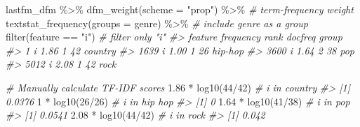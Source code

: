 \documentclass[
]{article}
\newenvironment{Shaded}{\begin{snugshade}}{\end{snugshade}}
\newcommand{\AttributeTok}[1]{\textcolor[rgb]{0.77,0.63,0.00}{#1}}
\newcommand{\CommentTok}[1]{\textcolor[rgb]{0.56,0.35,0.01}{\textit{#1}}}
\newcommand{\DecValTok}[1]{\textcolor[rgb]{0.00,0.00,0.81}{#1}}
\newcommand{\FloatTok}[1]{\textcolor[rgb]{0.00,0.00,0.81}{#1}}
\newcommand{\FunctionTok}[1]{\textcolor[rgb]{0.00,0.00,0.00}{#1}}
\newcommand{\NormalTok}[1]{#1}
\newcommand{\SpecialCharTok}[1]{\textcolor[rgb]{0.00,0.00,0.00}{#1}}
\newcommand{\StringTok}[1]{\textcolor[rgb]{0.31,0.60,0.02}{#1}}
\begin{document}
\begin{Shaded}
\begin{Highlighting}[]
\NormalTok{lastfm\_dfm }\SpecialCharTok{\%\textgreater{}\%} 
  \FunctionTok{dfm\_weight}\NormalTok{(}\AttributeTok{scheme =} \StringTok{"prop"}\NormalTok{) }\SpecialCharTok{\%\textgreater{}\%} \CommentTok{\# term{-}frequency weight}
  \FunctionTok{textstat\_frequency}\NormalTok{(}\AttributeTok{groups =}\NormalTok{ genre) }\SpecialCharTok{\%\textgreater{}\%} \CommentTok{\# include genre as a group}
  \FunctionTok{filter}\NormalTok{(feature }\SpecialCharTok{==} \StringTok{"i"}\NormalTok{) }\CommentTok{\# filter only "i"}
\CommentTok{\#\textgreater{}      feature frequency rank docfreq   group}
\CommentTok{\#\textgreater{} 1          i      1.86    1      42 country}
\CommentTok{\#\textgreater{} 1639       i      1.00    1      26 hip{-}hop}
\CommentTok{\#\textgreater{} 3600       i      1.64    2      38     pop}
\CommentTok{\#\textgreater{} 5012       i      2.08    1      42    rock}
\end{Highlighting}
\end{Shaded}

\begin{Shaded}
\begin{Highlighting}[]
\CommentTok{\# Manually calculate TF{-}IDF scores}
\FloatTok{1.86} \SpecialCharTok{*} \FunctionTok{log10}\NormalTok{(}\DecValTok{44}\SpecialCharTok{/}\DecValTok{42}\NormalTok{)  }\CommentTok{\# i in country}
\CommentTok{\#\textgreater{} [1] 0.0376}
\DecValTok{1} \SpecialCharTok{*} \FunctionTok{log10}\NormalTok{(}\DecValTok{26}\SpecialCharTok{/}\DecValTok{26}\NormalTok{)  }\CommentTok{\# i in hip hop}
\CommentTok{\#\textgreater{} [1] 0}
\FloatTok{1.64} \SpecialCharTok{*} \FunctionTok{log10}\NormalTok{(}\DecValTok{41}\SpecialCharTok{/}\DecValTok{38}\NormalTok{)  }\CommentTok{\# i in pop}
\CommentTok{\#\textgreater{} [1] 0.0541}
\FloatTok{2.08} \SpecialCharTok{*} \FunctionTok{log10}\NormalTok{(}\DecValTok{44}\SpecialCharTok{/}\DecValTok{42}\NormalTok{)  }\CommentTok{\# i in rock}
\CommentTok{\#\textgreater{} [1] 0.042}
\end{Highlighting}
\end{Shaded}
\end{document}
